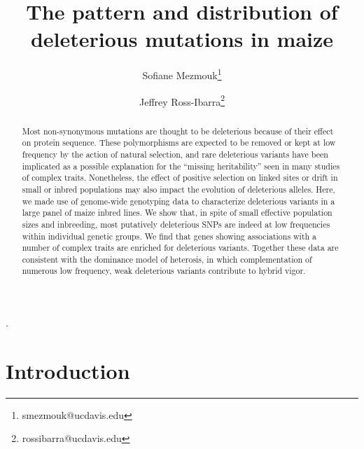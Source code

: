 \documentclass[12pt]{article}
\title{The pattern and distribution of deleterious mutations in maize}
\author[1]{Sofiane Mezmouk\thanks{smezmouk@ucdavis.edu}}
\author[1,2]{Jeffrey Ross-Ibarra\thanks{rossibarra@ucdavis.edu}}
\affil[1]{Department of Plant Sciences, University of California Davis}
\affil[2]{Center for Population Biology and Genome Center, University of California Davis}
\date{}
\begin{document}
\maketitle


\begin{abstract} 
Most non-synonymous mutations are thought to be deleterious because of their effect on protein sequence.  
These polymorphisms are expected to be removed or kept at low frequency by the action of natural selection, and rare deleterious variants have been implicated as a possible explanation for the ``missing heritability'' seen in many studies of complex traits. Nonetheless, the effect of positive selection on linked sites or drift in small or inbred populations may also impact the evolution of deleterious alleles. 
Here, we made use of genome-wide genotyping data to characterize deleterious variants in a large panel of maize inbred lines.  
We show that, in spite of small effective population sizes and inbreeding, most  putatively deleterious SNPs are indeed at low frequencies within individual genetic groups. 
We find that genes showing associations with a number of complex traits are enriched for deleterious variants. 
Together these data are consistent with the dominance model of heterosis, in which complementation of numerous low frequency, weak deleterious variants contribute to hybrid vigor.
\end{abstract}

\begin{footnotesize}
.

\end{footnotesize}

\newpage
\section*{Introduction}
\end{document}
